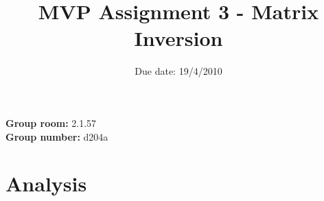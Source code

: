 \documentclass{article}
\title{MVP Assignment 3 - Matrix Inversion}
\date{Due date: 19/4/2010}
\begin{document}
\maketitle


\newcommand{\question}[1]{}
\newcommand{\answer}[1]{{#1}}

%
%
\answer{
\begin{flushleft}
{\bf Group room:} 2.1.57\\
{\bf Group number:} d204a\\
\end{flushleft}
}

\section{Analysis}

\question{
First we will analyse the code from \texttt{pmatrics.c} that you
discovered in the previous assignment. The example has been updated
for this assignment. The purpose is to parallize it using
\emph{pthreads}. The code supplied contains helpful comments.}
\end{document}
